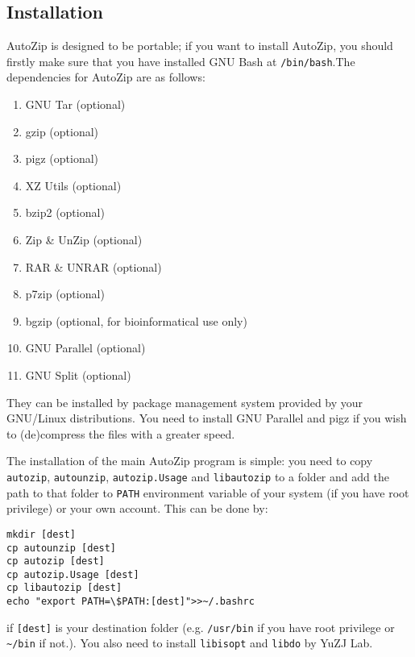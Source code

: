 \documentclass[fleqn,10pt]{SelfArx} %
\begin{document}
\subsection{Installation}
AutoZip is designed to be portable; if you want to install AutoZip, you should firstly make sure that you have installed GNU Bash at \verb|/bin/bash|.The dependencies for AutoZip are as follows:
\begin{enumerate}
\item GNU Tar (optional)
\item gzip (optional)
\item pigz (optional)
\item XZ Utils (optional)
\item bzip2 (optional)
\item Zip \& UnZip (optional)
\item RAR \& UNRAR (optional)
\item p7zip (optional)
\item bgzip (optional, for bioinformatical use only)
\item GNU Parallel (optional)
\item GNU Split (optional)
\end{enumerate}
They can be installed by package management system provided by your GNU/Linux distributions. You need to install GNU Parallel and pigz if you wish to (de)compress the files with a greater speed.\par
The installation of the main AutoZip program is simple: you need to copy \verb|autozip|, \verb|autounzip|, \verb|autozip.Usage| and \verb|libautozip| to a folder and add the path to that folder to \verb|PATH| environment variable of your system (if you have root privilege) or your own account. This can be done by:
\begin{verbatim}
mkdir [dest]
cp autounzip [dest]
cp autozip [dest]
cp autozip.Usage [dest]
cp libautozip [dest]
echo "export PATH=\$PATH:[dest]">>~/.bashrc
\end{verbatim}
if \verb|[dest]| is your destination folder (e.g. \verb|/usr/bin| if you have root privilege or \verb|~/bin| if not.). You also need to install \verb|libisopt| and \verb|libdo| by YuZJ Lab.
\end{document}

